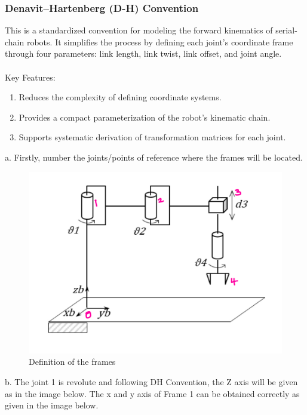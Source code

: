 \documentclass[12pt]{report}
\begin{document}
\subsubsection{Denavit–Hartenberg (D-H) Convention}

This is a standardized convention for modeling the forward kinematics of serial-chain robots. It simplifies the process by defining each joint’s coordinate frame through four parameters: link length, link twist, link offset, and joint angle.\\\\
Key Features:
\begin{enumerate}[label=\roman*.]
	\item Reduces the complexity of defining coordinate systems.
	\item Provides a compact parameterization of the robot's kinematic chain.
	\item Supports systematic derivation of transformation matrices for each joint.\\
\end{enumerate}
a. Firstly, number the joints/points of reference where the frames will be located. 

	\begin{figure}[H]
	\centering
	\includegraphics[scale = 0.25]{1} %
	\caption{Definition of the frames}
	\label{fig:d} %
\end{figure}
b. The joint 1 is revolute and following DH Convention, the Z axis will be given as in the image below. The x and y axis of Frame 1 can be obtained correctly as given in the image below.
\end{document}
